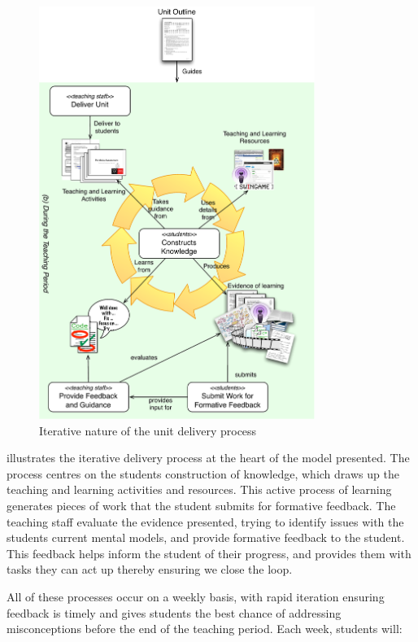 \begin{figure}[p]
	\centering
	\includegraphics[width=0.8\textwidth]{DeliverUnit}
	\caption{Iterative nature of the unit delivery process}
	\label{fig:deliver_unit}
\end{figure}

 illustrates the iterative delivery process at the heart of the model presented. The process centres on the students construction of knowledge, which draws up the teaching and learning activities and resources. This active process of learning generates pieces of work that the student submits for formative feedback. The teaching staff evaluate the evidence presented, trying to identify issues with the students current mental models, and provide formative feedback to the student. This feedback helps inform the student of their progress, and provides them with tasks they can act up thereby ensuring we close the loop.

All of these processes occur on a weekly basis, with rapid iteration ensuring feedback is timely and gives students the best chance of addressing misconceptions before the end of the teaching period. Each week, students will:

